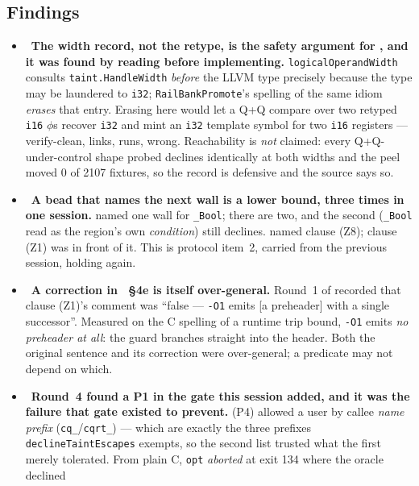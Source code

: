 \subsection*{Findings}
\begin{itemize}
  \item \fconfirmed\ \textbf{The width record, not the retype, is the safety argument for
        , and it was found by reading before implementing.}
        \texttt{logicalOperandWidth} consults \texttt{taint.HandleWidth} \emph{before} the LLVM type
        precisely because the type may be laundered to \texttt{i32}; \texttt{RailBankPromote}'s
        spelling of the same idiom \emph{erases} that entry. Erasing here would let a Q+Q compare
        over two retyped \texttt{i16} $\phi$s recover \texttt{i32} and mint an \texttt{i32} template
        symbol for two \texttt{i16} registers --- verify-clean, links, runs, wrong. Reachability is
        \emph{not} claimed: every Q+Q-under-control shape probed declines identically at both widths
        and the peel moved 0 of 2107 fixtures, so the record is defensive and the source says so.
  \item \foverdecline\ \textbf{A bead that names the next wall is a lower bound, three times in one
        session.}  named one wall for \texttt{\_Bool}; there are two, and the second
        (\texttt{\_Bool} read as the region's own \emph{condition}) still declines.  named
        clause (Z8); clause (Z1) was in front of it. This is  protocol item~2,
        carried from the previous session, holding again.
  \item \fconfirmed\ \textbf{A correction in ~\S4e is itself over-general.}
        Round~1 of  recorded that clause (Z1)'s comment was ``false --- \texttt{-O1} emits
        [a preheader] with a single successor''. Measured on the C spelling of a runtime trip bound,
        \texttt{-O1} emits \emph{no preheader at all}: the guard branches straight into the header.
        Both the original sentence and its correction were over-general; a predicate may not depend
        on which.
  \item \fconfirmed\ \textbf{Round~4 found a P1 in the gate this session added, and it was the
        failure that gate existed to prevent.} (P4) allowed a user by callee \emph{name prefix}
        (\texttt{cq\_}/\texttt{cqrt\_}) --- which are exactly the three prefixes
        \texttt{declineTaintEscapes} exempts, so the second list trusted what the first merely
        tolerated. From plain C, \texttt{opt} \emph{aborted} at exit 134 where the oracle declined

\end{itemize}
